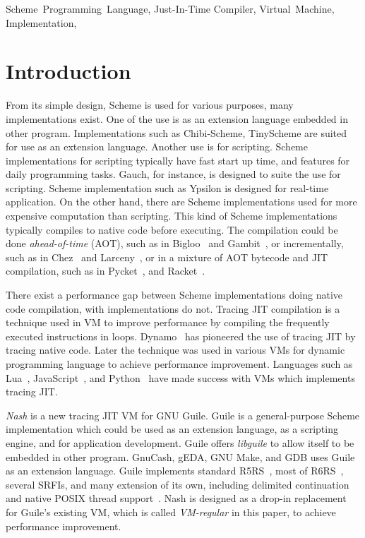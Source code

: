 \documentclass[preprint]{sigplanconf}
\begin{document}


\keywords{} Scheme~Programming~Language, Just-In-Time Compiler, Virtual~Machine,
Implementation,

\section{Introduction}

From its simple design, Scheme is used for various purposes, many
implementations exist. One of the use is as an extension language embedded in
other program. Implementations such as Chibi-Scheme, TinyScheme are suited for
use as an extension language. Another use is for scripting. Scheme
implementations for scripting typically have fast start up time, and features
for daily programming tasks. Gauch, for instance, is designed to suite the use
for scripting. Scheme implementation such as Ypsilon is designed for real-time
application. On the other hand, there are Scheme implementations used for more
expensive computation than scripting. This kind of Scheme implementations
typically compiles to native code before executing. The compilation could be
done \textit{ahead-of-time} (AOT), such as in Bigloo~\cite{serrano1995bigloo}
and Gambit~\cite{feeley1998gambit}, or incrementally, such as in
Chez~\cite{dybvig2006development} and Larceny~\cite{hansen1992impact}, or in a
mixture of AOT bytecode and JIT compilation, such as in
Pycket~\cite{bauman2015pycket}, and Racket~\cite{flatt2013racket}.

There exist a performance gap between Scheme implementations doing native code
compilation, with implementations do not. Tracing JIT compilation is a
technique used in VM to improve performance by compiling the frequently
executed instructions in loops. Dynamo~\cite{bala2000dynamo} has pioneered the
use of tracing JIT by tracing native code. Later the technique was used in
various VMs for dynamic programming language to achieve performance
improvement. Languages such as Lua~\cite{pall2016luajit},
JavaScript~\cite{gal2009trace}, and Python~\cite{bolz2009tracing} have made
success with VMs which implements tracing JIT.\@

\textit{Nash} is a new tracing JIT VM for GNU Guile. Guile is a
general-purpose Scheme implementation which could be used as an extension
language, as a scripting engine, and for application development. Guile offers
\textit{libguile} to allow itself to be embedded in other program. GnuCash,
gEDA, GNU Make, and GDB uses Guile as an extension language. Guile implements
standard R5RS~\cite{abelson1998revised5}, most of
R6RS~\cite{sperber2010revised}, several SRFIs, and many extension of its own,
including delimited continuation and native POSIX thread
support~\cite{Galassi02guilereference}. Nash is designed as a drop-in
replacement for Guile's existing VM, which is called \textit{VM-regular} in
this paper, to achieve performance improvement.
\end{document}
